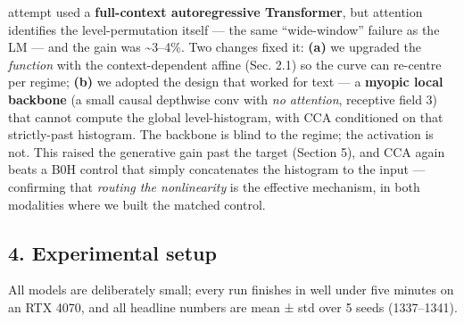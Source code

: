 \documentclass[
  11pt,
]{article}
\begin{document}
\begin{enumerate}
  attempt used a \textbf{full-context autoregressive Transformer}, but
  attention identifies the level-permutation itself --- the same
  ``wide-window'' failure as the LM --- and the gain was
  \textasciitilde3--4\%. Two changes fixed it: \textbf{(a)} we upgraded
  the \emph{function} with the context-dependent affine (Sec. 2.1) so
  the curve can re-centre per regime; \textbf{(b)} we adopted the design
  that worked for text --- a \textbf{myopic local backbone} (a small
  causal depthwise conv with \emph{no attention}, receptive field 3)
  that cannot compute the global level-histogram, with CCA conditioned
  on that strictly-past histogram. The backbone is blind to the regime;
  the activation is not. This raised the generative gain past the target
  (Section 5), and CCA again beats a B0H control that simply
  concatenates the histogram to the input --- confirming that
  \emph{routing the nonlinearity} is the effective mechanism, in both
  modalities where we built the matched control.
\end{enumerate}

\subsection{4. Experimental setup}\label{experimental-setup}

All models are deliberately small; every run finishes in well under five
minutes on an RTX 4070, and all headline numbers are mean ± std over 5
seeds (1337--1341).
\end{document}
